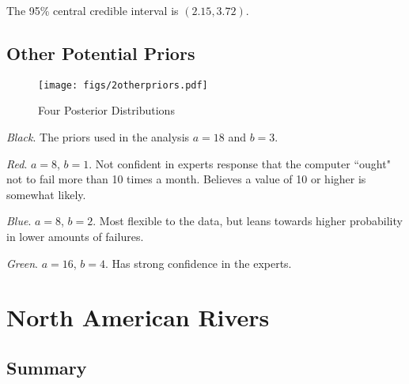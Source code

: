 \documentclass[12pt]{article}
\begin{document}
\noindent The 95\% central credible interval is $(2.15, 3.72)$.

\subsection{Other Potential Priors}

\begin{figure}[H]
\begin{center}
\texttt{[image: figs/2otherpriors.pdf]}
\caption{Four Posterior Distributions}
\end{center}
\end{figure}

\noindent \emph{Black}.  The priors used in the analysis $a=18$ and $b=3$.

\noindent \emph{Red}. $a=8$, $b=1$.  Not confident in experts response that the computer ``ought" not to fail more than 10 times a month.  Believes a value of 10 or higher is somewhat likely.

\noindent \emph{Blue}. $a=8$, $b=2$.  Most flexible to the data, but leans towards higher probability in lower amounts of failures.

\noindent \emph{Green}. $a=16$, $b=4$.  Has strong confidence in the experts.


%
%

\newpage

\section{North American Rivers}

\subsection{Summary}
\end{document}
